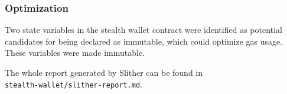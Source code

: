 \subsubsection*{Optimization}
Two state variables in the stealth wallet contract were identified as potential
candidates for being declared as immutable, which could optimize gas usage.
These variables were made immutable.

The whole report generated by Slither can be found in\\\texttt{stealth-wallet/slither-report.md}.
